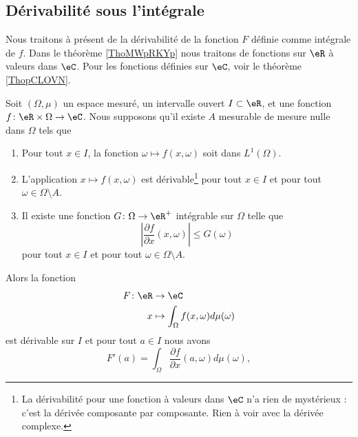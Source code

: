 \subsection{Dérivabilité sous l'intégrale}

Nous traitons à présent de la dérivabilité de la fonction \( F\) définie comme intégrale de \( f\). Dans le théorème \ref{ThoMWpRKYp} nous traitons de fonctions sur \( \eR\) à valeurs dans \( \eC\). Pour les fonctions définies sur \( \eC\), voir le théorème \ref{ThopCLOVN}.

\begin{theorem}    \label{ThoMWpRKYp}
	Soit \( (\Omega,\mu)\) un espace mesuré, un intervalle ouvert \( I\subset \eR\), et une fonction \( f\colon \eR\times \Omega\to \eC\). Nous supposons qu'il existe \( A\) mesurable de mesure nulle dans \( \Omega\) tels que
	\begin{enumerate}
		\item       \label{ITEMooAFVMooAeCEco}
		      Pour tout \( x\in I\), la fonction \( \omega\mapsto f(x,\omega)\) soit dans \( L^1(\Omega)\).
		\item        \label{ITEMooXIZXooGPYFyT}
		      L'application \( x\mapsto f(x,\omega)\) est dérivable\footnote{La dérivabilité pour une fonction à valeurs dans \( \eC\) n'a rien de mystérieux : c'est la dérivée composante par composante. Rien à voir avec la dérivée complexe.} pour tout \( x\in I\) et pour tout \( \omega\in \Omega\setminus A\).
		\item       \label{ITEMooDTTIooWkldfB}
		      Il existe une fonction \( G\colon \Omega\to \eR^+\) intégrable sur \( \Omega\) telle que
		      \begin{equation}        \label{EQooUHQYooHtwfML}
			      \left| \frac{ \partial f }{ \partial x }(x,\omega) \right| \leq G(\omega)
		      \end{equation}
		      pour tout \( x\in I\) et pour tout \( \omega\in\Omega\setminus A\).
	\end{enumerate}
	Alors la fonction
	\begin{equation}
		\begin{aligned}
			F\colon \eR & \to \eC                                      \\
			x           & \mapsto \int_{\Omega}f(x,\omega)d\mu(\omega)
		\end{aligned}
	\end{equation}
	est dérivable sur \( I\) et pour tout \( a\in I\) nous avons
	\begin{equation}
		F'(a)=\int_{\Omega}\frac{ \partial f }{ \partial x }(a,\omega)d\mu(\omega),
	\end{equation}
\end{theorem}


